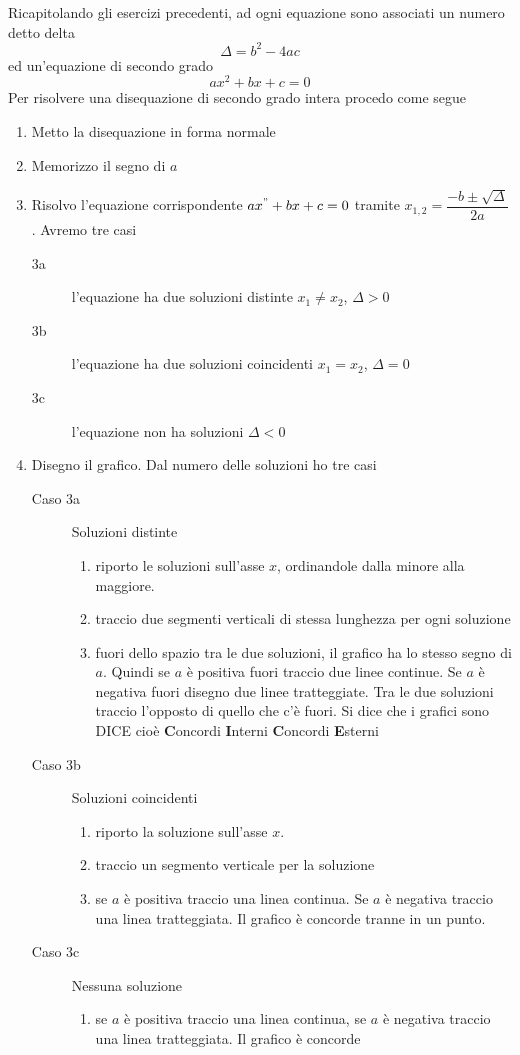 Ricapitolando gli esercizi precedenti, ad ogni equazione sono associati un numero detto delta \[\Delta=b^2-4ac\] ed un'equazione di secondo grado\[ax^2+bx+c=0\]  Per risolvere una disequazione di secondo grado intera procedo come segue
\begin{enumerate}
	\item Metto la disequazione in forma normale
	\item Memorizzo il segno di $a$
	\item Risolvo l'equazione corrispondente $ax^"+bx+c=0$ tramite $x_{1,2}=\dfrac{-b\pm\sqrt{\Delta}}{2a}$. Avremo tre casi
	\begin{description}
		\item[3a] l'equazione ha due soluzioni distinte $x_1\neq x_2$, $\Delta>0$
		\item[3b] l'equazione ha due soluzioni coincidenti $x_1= x_2$, $\Delta=0$
		\item[3c] l'equazione non ha soluzioni $\Delta<0$
	\end{description}
\item Disegno il grafico. Dal numero delle soluzioni ho tre casi
\begin{description}
	\item[Caso 3a] Soluzioni distinte\begin{enumerate}
		\item riporto le soluzioni sull'asse $x$, ordinandole dalla minore  alla maggiore.
		\item traccio due segmenti verticali di stessa lunghezza per ogni soluzione
		\item fuori dello spazio tra le due soluzioni, il grafico ha lo stesso segno di $a$. Quindi se $a$ è positiva fuori traccio due linee continue. Se $a$ è negativa fuori  disegno due linee tratteggiate. Tra le due soluzioni traccio l'opposto di quello che c'è fuori. Si dice che i grafici sono DICE cioè \textbf{C}oncordi \textbf{I}nterni \textbf{C}oncordi \textbf{E}sterni
	\end{enumerate}
\item[Caso 3b] Soluzioni coincidenti
\begin{enumerate}
	\item riporto la soluzione sull'asse $x$.
	\item traccio un segmento verticale per la soluzione
	\item  se $a$ è positiva traccio una linea continua. Se $a$ è negativa  traccio una linea tratteggiata. Il grafico è concorde tranne in un punto.
\end{enumerate} 
\item[Caso 3c] Nessuna soluzione
\begin{enumerate}
	\item se $a$ è positiva traccio una linea continua, se $a$ è negativa traccio una linea tratteggiata. Il grafico è concorde
\end{enumerate}
\end{description}
\end{enumerate}
